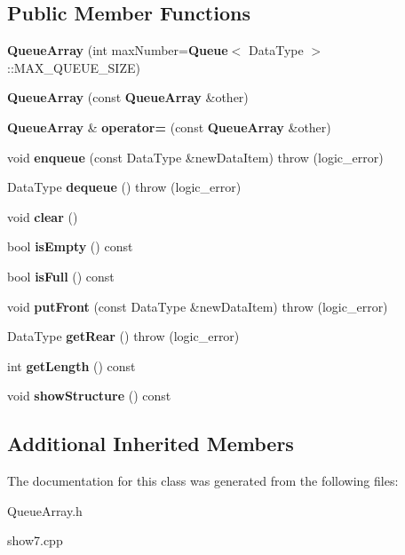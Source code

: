 \subsection*{Public Member Functions}
\begin{DoxyCompactItemize}
\item 
{\bfseries Queue\+Array} (int max\+Number={\bf Queue}$<$ Data\+Type $>$\+::M\+A\+X\+\_\+\+Q\+U\+E\+U\+E\+\_\+\+S\+I\+Z\+E)\label{class_queue_array_a112114659f8c2590872426a2dee8e6cc}

\item 
{\bfseries Queue\+Array} (const {\bf Queue\+Array} \&other)\label{class_queue_array_a08df206def55e930c9c561ee8bc93422}

\item 
{\bf Queue\+Array} \& {\bfseries operator=} (const {\bf Queue\+Array} \&other)\label{class_queue_array_adaad55e5da06583cc786af90937a94c1}

\item 
void {\bfseries enqueue} (const Data\+Type \&new\+Data\+Item)  throw (logic\+\_\+error)\label{class_queue_array_a15e0632c580858c396d3aac1265fecd7}

\item 
Data\+Type {\bfseries dequeue} ()  throw (logic\+\_\+error)\label{class_queue_array_a34d386d2323aa80b7b441d4436153a89}

\item 
void {\bfseries clear} ()\label{class_queue_array_a154afbf4084cb08e3a134f2f6a33df6c}

\item 
bool {\bfseries is\+Empty} () const \label{class_queue_array_ae1298c7e16e1053b628a019e71db4320}

\item 
bool {\bfseries is\+Full} () const \label{class_queue_array_a7233d591dd81e9e3d3f6e4ad5631c81c}

\item 
void {\bfseries put\+Front} (const Data\+Type \&new\+Data\+Item)  throw (logic\+\_\+error)\label{class_queue_array_add18fcb931a244d56040a1f0a0c24a8f}

\item 
Data\+Type {\bfseries get\+Rear} ()  throw (logic\+\_\+error)\label{class_queue_array_a8bebf91214e116f74d4482bf9babee2d}

\item 
int {\bfseries get\+Length} () const \label{class_queue_array_a1d1bf41a4ca23c30f53296a0e0c5bf33}

\item 
void {\bfseries show\+Structure} () const \label{class_queue_array_adde651b7fd7865dc4f281e21c7f1a6c3}

\end{DoxyCompactItemize}
\subsection*{Additional Inherited Members}


The documentation for this class was generated from the following files\+:\begin{DoxyCompactItemize}
\item 
Queue\+Array.\+h\item 
show7.\+cpp\end{DoxyCompactItemize}
